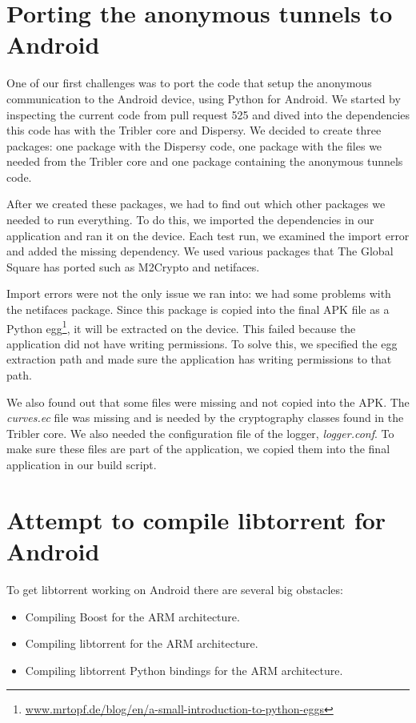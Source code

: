 	\section{Porting the anonymous tunnels to Android}
		One of our first challenges was to port the code that setup the anonymous communication to the Android device, using Python for Android. We started by inspecting the current code from pull request 525 and dived into the dependencies this code has with the Tribler core and Dispersy. We decided to create three packages: one package with the Dispersy code, one package with the files we needed from the Tribler core and one package containing the anonymous tunnels code.
		
		After we created these packages, we had to find out which other packages we needed to run everything. To do this, we imported the dependencies in our application and ran it on the device. Each test run, we examined the import error and added the missing dependency. We used various packages that The Global Square has ported such as M2Crypto and netifaces.
		
		Import errors were not the only issue we ran into: we had some problems with the netifaces package. Since this package is copied into the final APK file as a Python egg\footnote{\href{http://mrtopf.de/blog/en/a-small-introduction-to-python-eggs/}{www.mrtopf.de/blog/en/a-small-introduction-to-python-eggs}}, it will be extracted on the device. This failed because the application did not have writing permissions. To solve this, we specified the egg extraction path and made sure the application has writing permissions to that path.
		
		We also found out that some files were missing and not copied into the APK. The \emph{curves.ec} file was missing and is needed by the cryptography classes found in the Tribler core. We also needed the configuration file of the logger, \emph{logger.conf}. To make sure these files are part of the application, we copied them into the final application in our build script.
		
	\section{Attempt to compile libtorrent for Android}
		To get libtorrent working on Android there are several big obstacles:
		\begin{itemize}
			\item Compiling Boost for the ARM architecture.
			\item Compiling libtorrent for the ARM architecture.
			\item Compiling libtorrent Python bindings for the ARM architecture.
		\end{itemize}
		
